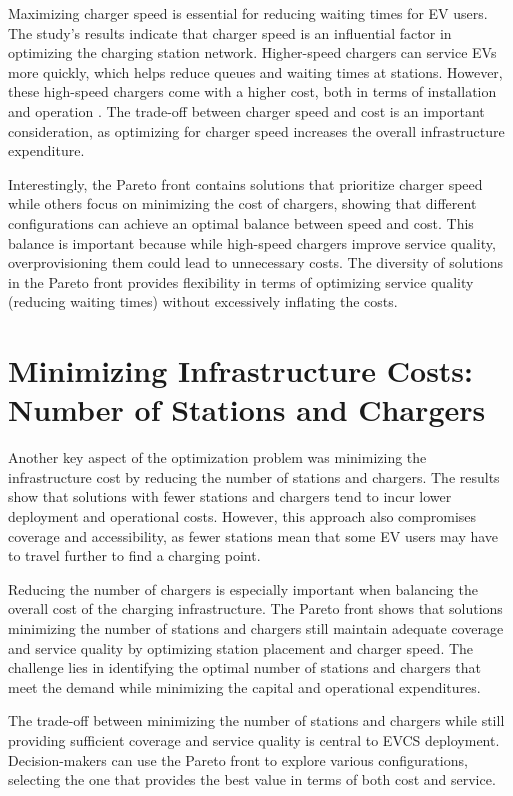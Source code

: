 Maximizing charger speed is essential for reducing waiting times for EV users. The study’s results indicate that charger speed is an influential factor in optimizing the charging station network. Higher-speed chargers can service EVs more quickly, which helps reduce queues and waiting times at stations. However, these high-speed chargers come with a higher cost, both in terms of installation and operation \citep{A genetic algorithm-based optimization for the location of electric vehicle charging stations}. The trade-off between charger speed and cost is an important consideration, as optimizing for charger speed increases the overall infrastructure expenditure.

Interestingly, the Pareto front contains solutions that prioritize charger speed while others focus on minimizing the cost of chargers, showing that different configurations can achieve an optimal balance between speed and cost. This balance is important because while high-speed chargers improve service quality, overprovisioning them could lead to unnecessary costs. The diversity of solutions in the Pareto front provides flexibility in terms of optimizing service quality (reducing waiting times) without excessively inflating the costs.

\section{Minimizing Infrastructure Costs: Number of Stations and Chargers}

Another key aspect of the optimization problem was minimizing the infrastructure cost by reducing the number of stations and chargers. The results show that solutions with fewer stations and chargers tend to incur lower deployment and operational costs. However, this approach also compromises coverage and accessibility, as fewer stations mean that some EV users may have to travel further to find a charging point.

Reducing the number of chargers is especially important when balancing the overall cost of the charging infrastructure. The Pareto front shows that solutions minimizing the number of stations and chargers still maintain adequate coverage and service quality by optimizing station placement and charger speed. The challenge lies in identifying the optimal number of stations and chargers that meet the demand while minimizing the capital and operational expenditures.

The trade-off between minimizing the number of stations and chargers while still providing sufficient coverage and service quality is central to EVCS deployment. Decision-makers can use the Pareto front to explore various configurations, selecting the one that provides the best value in terms of both cost and service.

